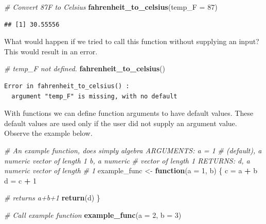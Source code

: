 \documentclass[
]{book}
\newenvironment{Shaded}{\begin{snugshade}}{\end{snugshade}}
\newcommand{\CommentTok}[1]{\textcolor[rgb]{0.56,0.35,0.01}{\textit{#1}}}
\newcommand{\ControlFlowTok}[1]{\textcolor[rgb]{0.13,0.29,0.53}{\textbf{#1}}}
\newcommand{\DataTypeTok}[1]{\textcolor[rgb]{0.13,0.29,0.53}{#1}}
\newcommand{\DecValTok}[1]{\textcolor[rgb]{0.00,0.00,0.81}{#1}}
\newcommand{\KeywordTok}[1]{\textcolor[rgb]{0.13,0.29,0.53}{\textbf{#1}}}
\newcommand{\NormalTok}[1]{#1}
\newcommand{\OperatorTok}[1]{\textcolor[rgb]{0.81,0.36,0.00}{\textbf{#1}}}
\newcommand{\StringTok}[1]{\textcolor[rgb]{0.31,0.60,0.02}{#1}}
\begin{document}
\begin{Shaded}
\begin{Highlighting}[]
\CommentTok{# Convert 87F to Celsius}
\KeywordTok{fahrenheit_to_celsius}\NormalTok{(}\DataTypeTok{temp_F =} \DecValTok{87}\NormalTok{)}
\end{Highlighting}
\end{Shaded}

\begin{verbatim}
## [1] 30.55556
\end{verbatim}

What would happen if we tried to call this function without supplying an input? This would result in an error.

\begin{Shaded}
\begin{Highlighting}[]
\CommentTok{# temp_F not defined.}
\KeywordTok{fahrenheit_to_celsius}\NormalTok{()}
\end{Highlighting}
\end{Shaded}

\begin{verbatim}
Error in fahrenheit_to_celsius() : 
  argument "temp_F" is missing, with no default
\end{verbatim}

With functions we can define function arguments to have default values. These default values are used only if the user did not supply an argument value. Observe the example below.

\begin{Shaded}
\begin{Highlighting}[]
\CommentTok{# An example function, does simply algebra ARGUMENTS: a = 1}
\CommentTok{# (default), a numeric vector of length 1 b, a numeric}
\CommentTok{# vector of length 1 RETURNS: d, a numeric vector of length}
\CommentTok{# 1}
\NormalTok{example_func <-}\StringTok{ }\ControlFlowTok{function}\NormalTok{(}\DataTypeTok{a =} \DecValTok{1}\NormalTok{, b) \{}
\NormalTok{    c =}\StringTok{ }\NormalTok{a }\OperatorTok{+}\StringTok{ }\NormalTok{b}
\NormalTok{    d =}\StringTok{ }\NormalTok{c }\OperatorTok{+}\StringTok{ }\DecValTok{1}

    \CommentTok{# returns a+b+1}
    \KeywordTok{return}\NormalTok{(d)}
\NormalTok{\}}

\CommentTok{# Call example function}
\KeywordTok{example_func}\NormalTok{(}\DataTypeTok{a =} \DecValTok{2}\NormalTok{, }\DataTypeTok{b =} \DecValTok{3}\NormalTok{)}
\end{Highlighting}
\end{Shaded}
\end{document}
